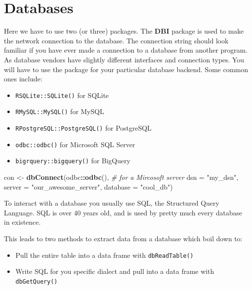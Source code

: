 \documentclass[]{book}
\newenvironment{Shaded}{\begin{snugshade}}{\end{snugshade}}
\newcommand{\KeywordTok}[1]{\textcolor[rgb]{0.13,0.29,0.53}{\textbf{#1}}}
\newcommand{\DataTypeTok}[1]{\textcolor[rgb]{0.13,0.29,0.53}{#1}}
\newcommand{\StringTok}[1]{\textcolor[rgb]{0.31,0.60,0.02}{#1}}
\newcommand{\CommentTok}[1]{\textcolor[rgb]{0.56,0.35,0.01}{\textit{#1}}}
\newcommand{\OperatorTok}[1]{\textcolor[rgb]{0.81,0.36,0.00}{\textbf{#1}}}
\newcommand{\NormalTok}[1]{#1}
\providecommand{\tightlist}{%
  \setlength{\itemsep}{0pt}\setlength{\parskip}{0pt}}
\begin{document}
\section{Databases}\label{databases}

Here we have to use two (or three) packages. The \textbf{DBI} package is
used to make the network connection to the database. The connection
string should look familiar if you have ever made a connection to a
database from another program. As database vendors have slightly
different interfaces and connection types. You will have to use the
package for your particular database backend. Some common ones include:

\begin{itemize}
\tightlist
\item
  \texttt{RSQLite::SQLite()} for SQLite
\item
  \texttt{RMySQL::MySQL()} for MySQL
\item
  \texttt{RPostgreSQL::PostgreSQL()} for PostgreSQL
\item
  \texttt{odbc::odbc()} for Microsoft SQL Server
\item
  \texttt{bigrquery::bigquery()} for BigQuery
\end{itemize}

\begin{Shaded}
\begin{Highlighting}[]
\NormalTok{con <-}\StringTok{ }\KeywordTok{dbConnect}\NormalTok{(odbc}\OperatorTok{::}\KeywordTok{odbc}\NormalTok{(),               }\CommentTok{# for a Mircosoft server}
                 \DataTypeTok{dsn      =} \StringTok{"my_dsn"}\NormalTok{, }
                 \DataTypeTok{server   =} \StringTok{"our_awesome_server"}\NormalTok{,}
                 \DataTypeTok{database =} \StringTok{"cool_db"}\NormalTok{)}
\end{Highlighting}
\end{Shaded}

To interact with a database you usually use SQL, the Structured Query
Language. SQL is over 40 years old, and is used by pretty much every
database in existence.

This leads to two methods to extract data from a database which boil
down to:

\begin{itemize}
\tightlist
\item
  Pull the entire table into a data frame with \texttt{dbReadTable()}
\item
  Write SQL for you specific dialect and pull into a data frame with
  \texttt{dbGetQuery()}
\end{itemize}
\end{document}
